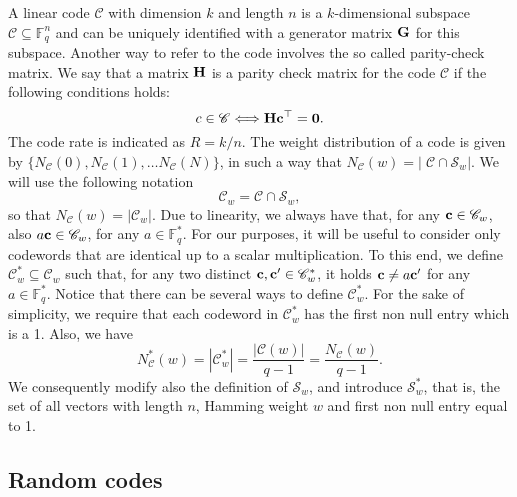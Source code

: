 A linear code $\mathscr{C}$ with dimension $k$ and length $n$ is a $k$-dimensional subspace $\mathscr C\subseteq \mathbb F_q^n$ and can be uniquely identified with a generator matrix $\mathbf G$ for this subspace. Another way to refer to the code involves the so called parity-check matrix. We say that a matrix $\mathbf H$ is a parity check matrix for the code $\mathscr{C}$ if the following conditions holds: $$c \in \mathscr{C} \Longleftrightarrow \mathbf H \mathbf c^{\top}= \mathbf0.$$
The code rate is indicated as $R = k/n$.
The weight distribution of a code is given by $\{N_{\mathscr{C}}(0), N_{\mathscr{C}}(1),\ldots N_{\mathscr{C}}(N)\}$, in such a way that $N_{\mathscr{C}}(w) = \left|\; \mathscr C \cap \mathscr S_{w}\right|.$
We will use the following notation
$$\mathscr C_w = \mathscr C \cap \mathscr S_{w},$$
so that $N_{\mathscr{C}}(w) = |\mathscr C_w|$.
Due to linearity, we always have that, for any $\mathbf c\in\mathscr C_w$, also $a\mathbf c\in\mathscr C_w$, for any $a\in\mathbb F_q^*$.
For our purposes, it will be useful to consider only codewords that are identical up to a scalar multiplication.
To this end, we define 
$\mathscr C_w^* \subseteq \mathscr C_w$ such that, for any two distinct $\mathbf c, \mathbf c'\in\mathscr C_w^*$, it holds $\mathbf c\neq a\mathbf c'$ for any $a\in\mathbb F_q^*$.
Notice that there can be several ways to define $\mathscr C_w^*$.
For the sake of simplicity, we require that each codeword in $\mathscr C_w^*$ has the first non null entry which is a 1.
Also, we have 
$$N_{\mathscr{C}}^*(w) = |\mathscr C^*_w| = \frac{|\mathscr C(w)|}{q-1} = \frac{N_{\mathscr{C}}(w)}{q-1}.$$
We consequently modify also the definition of $\mathscr S_w$, and introduce $\mathscr S_w^*$, that is, the set of all vectors with length $n$, Hamming weight $w$ and first non null entry equal to 1.


\subsection{Random codes}

